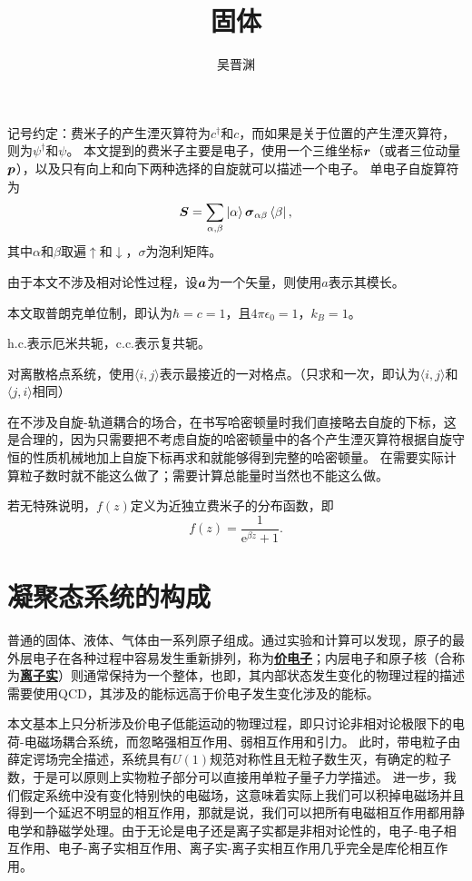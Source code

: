 \documentclass[hyperref, UTF8, a4paper]{ctexart}
\title{固体}
\author{吴晋渊}
\newcommand*{\ee}{\mathrm{e}}
\newcommand*{\pair}[1]{\langle #1 \rangle}
\newcommand*{\concept}[1]{\underline{\textbf{#1}}}
\begin{document}
\maketitle

记号约定：费米子的产生湮灭算符为${c}^\dagger$和${c}$，而如果是关于位置的产生湮灭算符，则为${\psi}^\dagger$和${\psi}$。
本文提到的费米子主要是电子，使用一个三维坐标$\vb*{r}$（或者三位动量$\vb*{p}$），以及只有向上和向下两种选择的自旋就可以描述一个电子。
单电子自旋算符为
\[
    {\vb*{S}} = \sum_{\alpha, \beta} \ket{\alpha} \vb*{\sigma}_{\alpha \beta} \bra{\beta},
\]
其中$\alpha$和$\beta$取遍$\uparrow$和$\downarrow$，$\sigma$为泡利矩阵。

由于本文不涉及相对论性过程，设$\vb*{a}$为一个矢量，则使用$a$表示其模长。

本文取普朗克单位制，即认为$\hbar=c=1$，且$4\pi\epsilon_0=1$，$k_B=1$。

$\text{h.c.}$表示厄米共轭，$\text{c.c.}$表示复共轭。

对离散格点系统，使用$\pair{i, j}$表示最接近的一对格点。（只求和一次，即认为$\pair{i, j}$和$\pair{j, i}$相同）

在不涉及自旋-轨道耦合的场合，在书写哈密顿量时我们直接略去自旋的下标，这是合理的，因为只需要把不考虑自旋的哈密顿量中的各个产生湮灭算符根据自旋守恒的性质机械地加上自旋下标再求和就能够得到完整的哈密顿量。
在需要实际计算粒子数时就不能这么做了；需要计算总能量时当然也不能这么做。

若无特殊说明，$f(z)$定义为近独立费米子的分布函数，即
\[
    f(z) = \frac{1}{\ee^{\beta z} + 1}.
\]

\section{凝聚态系统的构成}

普通的固体、液体、气体由一系列原子组成。通过实验和计算可以发现，原子的最外层电子在各种过程中容易发生重新排列，称为\concept{价电子}；内层电子和原子核（合称为\concept{离子实}）则通常保持为一个整体，也即，其内部状态发生变化的物理过程的描述需要使用QCD，其涉及的能标远高于价电子发生变化涉及的能标。

本文基本上只分析涉及价电子低能运动的物理过程，即只讨论非相对论极限下的电荷-电磁场耦合系统，而忽略强相互作用、弱相互作用和引力。
此时，带电粒子由薛定谔场完全描述，系统具有$U(1)$规范对称性且无粒子数生灭，有确定的粒子数，于是可以原则上实物粒子部分可以直接用单粒子量子力学描述。
进一步，我们假定系统中没有变化特别快的电磁场，这意味着实际上我们可以积掉电磁场并且得到一个延迟不明显的相互作用，那就是说，我们可以把所有电磁相互作用都用静电学和静磁学处理。由于无论是电子还是离子实都是非相对论性的，电子-电子相互作用、电子-离子实相互作用、离子实-离子实相互作用几乎完全是库伦相互作用。
\end{document}
